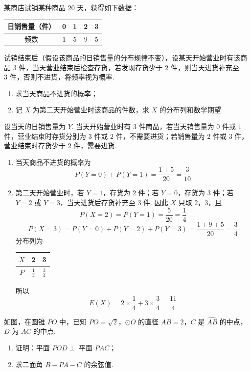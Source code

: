 \begin{problem}
某商店试销某种商品 \(20\text{ 天}\)，获得如下数据：

\begin{center}
\begin{tabular}{c|cccc}
日销售量（件） & 0 & 1 & 2 & 3 \\
\hline
频数 & 1 & 5 & 9 & 5
\end{tabular}
\end{center}

试销结束后（假设该商品的日销售量的分布规律不变），设某天开始营业时有该商品 \(3\text{ 件}\)，当天营业结束后检查存货，若发现存货少于 \(2\text{ 件}\)，则当天进货补充至 \(3\text{ 件}\)，否则不进货，将频率视为概率.

\begin{enumerate}
\item 求当天商品不进货的概率；
\item 记 \(X\) 为第二天开始营业时该商品的件数，求 \(X\) 的分布列和数学期望.
\end{enumerate}
\end{problem}

\begin{solution}
设当天的日销售量为 \(Y\). 当天开始营业时有 \(3\) 件商品，若当天销售量为 \(0\) 件或 \(1\) 件，营业结束时存货分别为 \(3\) 件或 \(2\) 件，不需要进货；若销售量为 \(2\) 件或 \(3\) 件，营业结束时存货少于 \(2\) 件，需要进货.

\begin{enumerate}
\item 当天商品不进货的概率为
\[
P(Y=0)+P(Y=1)=\frac{1+5}{20}=\frac{3}{10}
\]

\item 第二天开始营业时，若 \(Y=1\)，存货为 \(2\) 件；若 \(Y=0\)，存货为 \(3\) 件；若 \(Y=2\) 或 \(Y=3\)，当天进货后存货补充至 \(3\) 件. 因此 \(X\) 只取 \(2\)，\(3\)，且
\[
P(X=2)=P(Y=1)=\frac{5}{20}=\frac{1}{4}
\]
\[
P(X=3)=P(Y=0)+P(Y=2)+P(Y=3)=\frac{1+9+5}{20}=\frac{3}{4}
\]
分布列为
\begin{center}
\begin{tabular}{c|cc}
\(X\) & 2 & 3 \\
\hline
\(P\) & \(\frac{1}{4}\) & \(\frac{3}{4}\)
\end{tabular}
\end{center}
所以
\[
E(X)=2\times\frac{1}{4}+3\times\frac{3}{4}=\frac{11}{4}
\]
\end{enumerate}
\end{solution}

\begin{problem}
如图，在圆锥 \(PO\) 中，已知 \(PO = \sqrt{2}\)，\(\odot O\) 的直径 \(AB = 2\)，\(C\) 是 \(\widehat{AB}\) 的中点，\(D\) 为 \(AC\) 的中点.
\begin{enumerate}
\item 证明：平面 \(POD \perp\) 平面 \(PAC\)；
\item 求二面角 \(B - PA - C\) 的余弦值.
\end{enumerate}

\end{problem}


